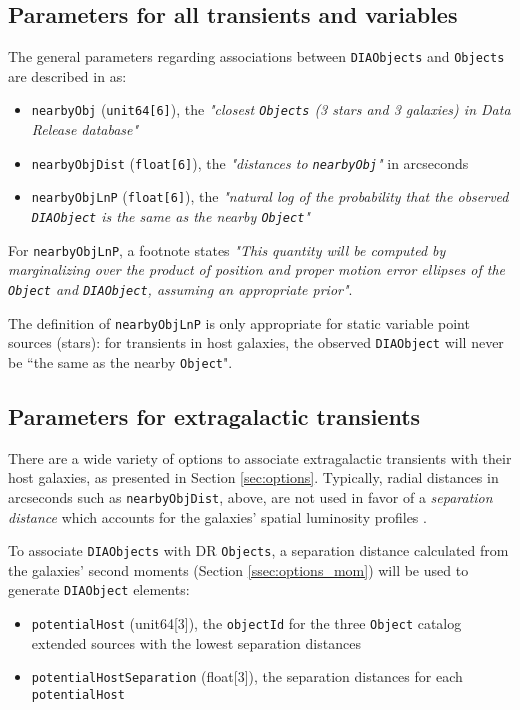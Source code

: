 \documentclass[DM,authoryear,toc]{lsstdoc}
\begin{document}
\subsection{Parameters for all transients and variables}\label{ssec:params_all}

The general parameters regarding associations between {\tt DIAObjects} and {\tt Objects} are described in  as:
\begin{itemize}
\item {\tt nearbyObj} ({\tt unit64[6]}), the {\it "closest {\tt Objects} (3 stars and 3 galaxies) in Data Release database"}
\item {\tt nearbyObjDist} ({\tt float[6]}), the {\it "distances to {\tt nearbyObj}"} in arcseconds
\item {\tt nearbyObjLnP} ({\tt float[6]}), the {\it "natural log of the probability that the observed {\tt DIAObject} is the same as the nearby {\tt Object}"}
\end{itemize}

For {\tt nearbyObjLnP}, a footnote states {\it "This quantity will be computed by marginalizing over the product of position and proper motion error ellipses of the {\tt Object} and {\tt DIAObject}, assuming an appropriate prior"}.

The definition of {\tt nearbyObjLnP} is only appropriate for static variable point sources (stars): for transients in host galaxies, the observed {\tt DIAObject} will never be ``the same as the nearby {\tt Object}".


\subsection{Parameters for extragalactic transients}\label{ssec:params_trans}

There are a wide variety of options to associate extragalactic transients with their host galaxies, as presented in Section \ref{sec:options}. 
Typically, radial distances in arcseconds such as {\tt nearbyObjDist}, above, are not used in favor of a \emph{separation distance} which accounts for the galaxies' spatial luminosity profiles \citep[e.g.,][]{2006ApJ...648..868S}.

To associate {\tt DIAObjects} with DR {\tt Objects}, a separation distance calculated from the galaxies' second moments (Section \ref{ssec:options_mom}) will be used to generate {\tt DIAObject} elements:
\begin{itemize}
\item {\tt potentialHost} (unit64[3]), the {\tt objectId} for the three {\tt Object} catalog extended sources with the lowest separation distances
\item {\tt potentialHostSeparation} (float[3]), the separation distances for each {\tt potentialHost}
\end{itemize}
\end{document}
